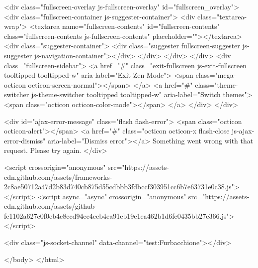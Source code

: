     <div class="fullscreen-overlay js-fullscreen-overlay" id="fullscreen_overlay">
  <div class="fullscreen-container js-suggester-container">
    <div class="textarea-wrap">
      <textarea name="fullscreen-contents" id="fullscreen-contents" class="fullscreen-contents js-fullscreen-contents" placeholder=""></textarea>
      <div class="suggester-container">
        <div class="suggester fullscreen-suggester js-suggester js-navigation-container"></div>
      </div>
    </div>
  </div>
  <div class="fullscreen-sidebar">
    <a href="#" class="exit-fullscreen js-exit-fullscreen tooltipped tooltipped-w" aria-label="Exit Zen Mode">
      <span class="mega-octicon octicon-screen-normal"></span>
    </a>
    <a href="#" class="theme-switcher js-theme-switcher tooltipped tooltipped-w"
      aria-label="Switch themes">
      <span class="octicon octicon-color-mode"></span>
    </a>
  </div>
</div>



    
    

    <div id="ajax-error-message" class="flash flash-error">
      <span class="octicon octicon-alert"></span>
      <a href="#" class="octicon octicon-x flash-close js-ajax-error-dismiss" aria-label="Dismiss error"></a>
      Something went wrong with that request. Please try again.
    </div>


      <script crossorigin="anonymous" src="https://assets-cdn.github.com/assets/frameworks-2c8ae50712a47d2b83d740cb875d55cdbbb3fdbccf303951cc6b7e63731e0c38.js"></script>
      <script async="async" crossorigin="anonymous" src="https://assets-cdn.github.com/assets/github-fe1102a627c0f0eb4c8ccd94ee4ecb4ea91eb19e1ea462b1d6fe0435bb27e366.js"></script>
      
      

      <div class="js-socket-channel" data-channel="test:Furbacchione"></div>

  </body>
</html>

